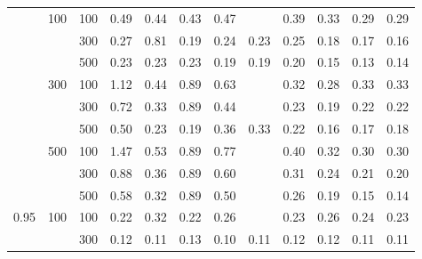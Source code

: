 \begin{longtable}{lll|p{1cm}p{1cm}p{1cm}p{1cm}p{1cm}p{1cm}p{1cm}p{1cm}p{1cm}}
\bottomrule
\endlastfoot
0.80 & 100 & 100 &    0.49 &            0.44 &            0.43 &           0.47 &                   &                      0.39 &                      0.33 &                       0.29 &                    0.29 \\
     &     & 300 &    0.27 &            0.81 &            0.19 &           0.24 &              0.23 &                      0.25 &                      0.18 &                       0.17 &                    0.16 \\
     &     & 500 &    0.23 &            0.23 &            0.23 &           0.19 &              0.19 &                      0.20 &                      0.15 &                       0.13 &                    0.14 \\
     & 300 & 100 &    1.12 &            0.44 &            0.89 &           0.63 &                   &                      0.32 &                      0.28 &                       0.33 &                    0.33 \\
     &     & 300 &    0.72 &            0.33 &            0.89 &           0.44 &                   &                      0.23 &                      0.19 &                       0.22 &                    0.22 \\
     &     & 500 &    0.50 &            0.23 &            0.19 &           0.36 &              0.33 &                      0.22 &                      0.16 &                       0.17 &                    0.18 \\
     & 500 & 100 &    1.47 &            0.53 &            0.89 &           0.77 &                   &                      0.40 &                      0.32 &                       0.30 &                    0.30 \\
     &     & 300 &    0.88 &            0.36 &            0.89 &           0.60 &                   &                      0.31 &                      0.24 &                       0.21 &                    0.20 \\
     &     & 500 &    0.58 &            0.32 &            0.89 &           0.50 &                   &                      0.26 &                      0.19 &                       0.15 &                    0.14 \\
0.95 & 100 & 100 &    0.22 &            0.32 &            0.22 &           0.26 &                   &                      0.23 &                      0.26 &                       0.24 &                    0.23 \\
     &     & 300 &    0.12 &            0.11 &            0.13 &           0.10 &              0.11 &                      0.12 &                      0.12 &                       0.11 &                    0.11 \\

\end{longtable}
